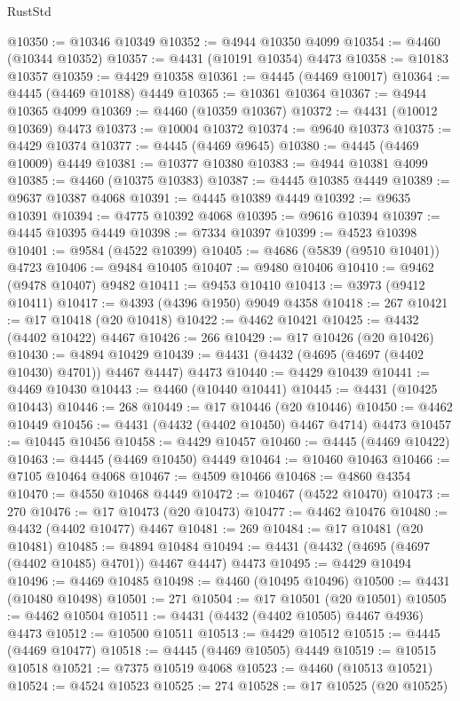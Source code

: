 \begin{lexlean}{RustStd}
\begin{coremodule}
@10350 := @10346 @10349
@10352 := @4944 @10350 @4099
@10354 := @4460 (@10344 @10352)
@10357 := @4431 (@10191 @10354) @4473
@10358 := @10183 @10357
@10359 := @4429 @10358
@10361 := @4445 (@4469 @10017)
@10364 := @4445 (@4469 @10188) @4449
@10365 := @10361 @10364
@10367 := @4944 @10365 @4099
@10369 := @4460 (@10359 @10367)
@10372 := @4431 (@10012 @10369) @4473
@10373 := @10004 @10372
@10374 := @9640 @10373
@10375 := @4429 @10374
@10377 := @4445 (@4469 @9645)
@10380 := @4445 (@4469 @10009) @4449
@10381 := @10377 @10380
@10383 := @4944 @10381 @4099
@10385 := @4460 (@10375 @10383)
@10387 := @4445 @10385 @4449
@10389 := @9637 @10387 @4068
@10391 := @4445 @10389 @4449
@10392 := @9635 @10391
@10394 := @4775 @10392 @4068
@10395 := @9616 @10394
@10397 := @4445 @10395 @4449
@10398 := @7334 @10397
@10399 := @4523 @10398
@10401 := @9584 (@4522 @10399)
@10405 := @4686 (@5839 (@9510 @10401)) @4723
@10406 := @9484 @10405
@10407 := @9480 @10406
@10410 := @9462 (@9478 @10407) @9482
@10411 := @9453 @10410
@10413 := @3973 (@9412 @10411)
@10417 := @4393 (@4396 @1950) @9049 @4358
@10418 := 267
@10421 := @17 @10418 (@20 @10418)
@10422 := @4462 @10421
@10425 := @4432 (@4402 @10422) @4467
@10426 := 266
@10429 := @17 @10426 (@20 @10426)
@10430 := @4894 @10429
@10439 := @4431 (@4432 (@4695 (@4697 (@4402 @10430) @4701)) @4467 @4447) @4473
@10440 := @4429 @10439
@10441 := @4469 @10430
@10443 := @4460 (@10440 @10441)
@10445 := @4431 (@10425 @10443)
@10446 := 268
@10449 := @17 @10446 (@20 @10446)
@10450 := @4462 @10449
@10456 := @4431 (@4432 (@4402 @10450) @4467 @4714) @4473
@10457 := @10445 @10456
@10458 := @4429 @10457
@10460 := @4445 (@4469 @10422)
@10463 := @4445 (@4469 @10450) @4449
@10464 := @10460 @10463
@10466 := @7105 @10464 @4068
@10467 := @4509 @10466
@10468 := @4860 @4354
@10470 := @4550 @10468 @4449
@10472 := @10467 (@4522 @10470)
@10473 := 270
@10476 := @17 @10473 (@20 @10473)
@10477 := @4462 @10476
@10480 := @4432 (@4402 @10477) @4467
@10481 := 269
@10484 := @17 @10481 (@20 @10481)
@10485 := @4894 @10484
@10494 := @4431 (@4432 (@4695 (@4697 (@4402 @10485) @4701)) @4467 @4447) @4473
@10495 := @4429 @10494
@10496 := @4469 @10485
@10498 := @4460 (@10495 @10496)
@10500 := @4431 (@10480 @10498)
@10501 := 271
@10504 := @17 @10501 (@20 @10501)
@10505 := @4462 @10504
@10511 := @4431 (@4432 (@4402 @10505) @4467 @4936) @4473
@10512 := @10500 @10511
@10513 := @4429 @10512
@10515 := @4445 (@4469 @10477)
@10518 := @4445 (@4469 @10505) @4449
@10519 := @10515 @10518
@10521 := @7375 @10519 @4068
@10523 := @4460 (@10513 @10521)
@10524 := @4524 @10523
@10525 := 274
@10528 := @17 @10525 (@20 @10525)

\end{coremodule}
\end{lexlean}
